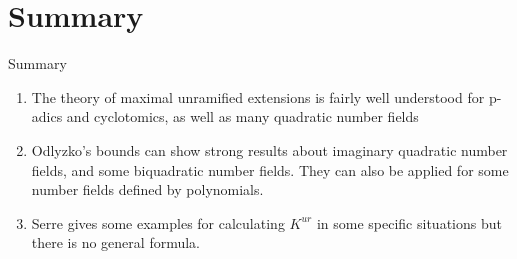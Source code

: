 \documentclass[10pt]{beamer}
\theoremstyle{plain} %
\begin{document}


\section{Summary}
\begin{frame}{Summary}
\pause

    \begin{enumerate}
        \item The theory of maximal unramified extensions is fairly well understood for p-adics and cyclotomics, as well as many quadratic number fields
        \pause

         \item Odlyzko's bounds can show strong results about imaginary quadratic number fields, and some biquadratic number fields. They can also be applied for some number fields defined by polynomials. 
         \pause

         \item Serre gives some examples for calculating $K^{ur}$ in some specific situations but there is no general formula. 
    \end{enumerate}
\end{frame}
\end{document}
